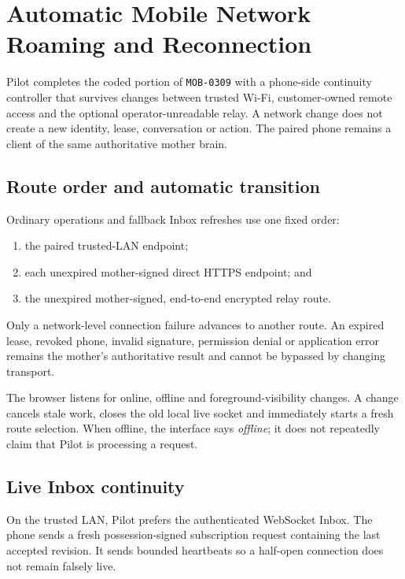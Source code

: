 \section{Automatic Mobile Network Roaming and Reconnection}
\label{sec:pilot-mobile-network-roaming}

Pilot completes the coded portion of \texttt{MOB-0309} with a phone-side continuity
controller that survives changes between trusted Wi-Fi, customer-owned remote access and
the optional operator-unreadable relay.  A network change does not create a new identity,
lease, conversation or action.  The paired phone remains a client of the same authoritative
mother brain.

\subsection{Route order and automatic transition}

Ordinary operations and fallback Inbox refreshes use one fixed order:
\begin{enumerate}
  \item the paired trusted-LAN endpoint;
  \item each unexpired mother-signed direct HTTPS endpoint; and
  \item the unexpired mother-signed, end-to-end encrypted relay route.
\end{enumerate}
Only a network-level connection failure advances to another route.  An expired lease,
revoked phone, invalid signature, permission denial or application error remains the
mother's authoritative result and cannot be bypassed by changing transport.

The browser listens for online, offline and foreground-visibility changes.  A change
cancels stale work, closes the old local live socket and immediately starts a fresh route
selection.  When offline, the interface says \emph{offline}; it does not repeatedly claim
that Pilot is processing a request.

\subsection{Live Inbox continuity}

On the trusted LAN, Pilot prefers the authenticated WebSocket Inbox.  The phone sends a
fresh possession-signed subscription request containing the last accepted revision.  It
sends bounded heartbeats so a half-open connection does not remain falsely live.

